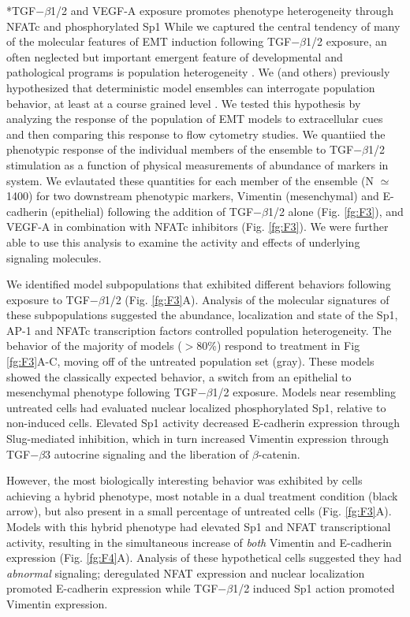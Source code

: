 \documentclass[12pt]{article}
\makeatletter
\renewcommand\subsection{\@startsection
	{subsection}{2}{0mm}
	{-0.05in}
	{-0.5\baselineskip}
	{\normalfont\normalsize\bfseries}}
\makeatother
\begin{document}
\clearpage

\subsection*{TGF$-\beta$1/2 and VEGF-A exposure promotes phenotype heterogeneity through NFATc and phosphorylated Sp1}
While we captured the central tendency of many of the molecular features of EMT induction following TGF$-\beta$1/2 exposure, an often neglected but important emergent
feature of developmental and pathological programs is population heterogeneity \citep{Park:2010fu}.
We (and others) previously hypothesized that deterministic model ensembles can interrogate population behavior, at least at a course grained level \citep{Lequieu:2011fj}.
We tested this hypothesis by analyzing the response of the population of EMT models to extracellular cues and then comparing this response to flow cytometry studies.
We quantiied the phenotypic response of the individual members of the ensemble to TGF$-\beta$1/2 stimulation as a function of physical measurements of abundance of markers in system.
We evlautated these quantities for each member of the ensemble (N $\simeq$ 1400) for two downstream phenotypic markers, Vimentin (mesenchymal) and E-cadherin (epithelial)
following the addition of TGF$-\beta$1/2 alone (Fig. \ref{fg:F3}), and VEGF-A in combination with NFATc inhibitors (Fig. \ref{fg:F3}).
We were further able to use this analysis to examine the activity and effects of underlying signaling molecules.

We identified model subpopulations that exhibited different behaviors following exposure to TGF$-\beta$1/2 (Fig. \ref{fg:F3}A).
Analysis of the molecular signatures of these subpopulations suggested the abundance, localization and state of the Sp1, AP-1 and NFATc transcription factors controlled population heterogeneity.
The behavior of the majority of models ($>$80\%) respond to treatment in Fig \ref{fg:F3}A-C, moving off of the untreated population set (gray).
These models showed the classically expected behavior, a switch from an epithelial to mesenchymal phenotype following TGF$-\beta$1/2 exposure.
Models near resembling untreated cells  had evaluated nuclear localized phosphorylated Sp1, relative to non-induced cells.
Elevated Sp1 activity decreased E-cadherin expression through Slug-mediated inhibition, which in turn increased Vimentin expression through TGF$-\beta$3 autocrine signaling and the liberation of $\beta$-catenin.

However, the most biologically interesting behavior was exhibited by cells achieving a hybrid phenotype, most notable in a dual treatment condition (black arrow), but also present in a small percentage of untreated cells (Fig. \ref{fg:F3}A).
Models with this hybrid phenotype had elevated Sp1 and NFAT transcriptional activity, resulting in the simultaneous increase of \emph{both} Vimentin and E-cadherin expression (Fig. \ref{fg:F4}A).
Analysis of these hypothetical cells suggested they had \emph{abnormal} signaling; deregulated NFAT expression and nuclear localization promoted E-cadherin expression while TGF$-\beta$1/2 induced Sp1 action promoted Vimentin expression.
\end{document}
